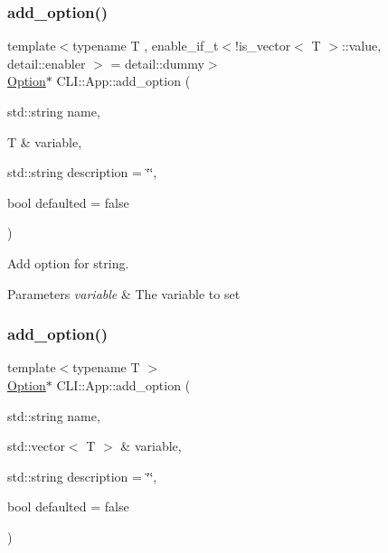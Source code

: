 \subsubsection{\texorpdfstring{add\+\_\+option()}{add\_option()}\hspace{0.1cm}{\footnotesize\ttfamily [2/3]}}
{\footnotesize\ttfamily template$<$typename T , enable\+\_\+if\+\_\+t$<$!is\+\_\+vector$<$ T $>$\+::value, detail\+::enabler $>$  = detail\+::dummy$>$ \\
\hyperlink{class_c_l_i_1_1_option}{Option}$\ast$ C\+L\+I\+::\+App\+::add\+\_\+option (\begin{DoxyParamCaption}\item[{std\+::string}]{name,  }\item[{T \&}]{variable,  }\item[{std\+::string}]{description = {\ttfamily \char`\"{}\char`\"{}},  }\item[{bool}]{defaulted = {\ttfamily false} }\end{DoxyParamCaption})\hspace{0.3cm}{\ttfamily [inline]}}



Add option for string. 


\begin{DoxyParams}{Parameters}
{\em variable} & The variable to set \\
\hline
\end{DoxyParams}
\mbox{\label{class_c_l_i_1_1_app_a0c65e4b0ad917b965e39d2e8f590bb53}} 
\subsubsection{\texorpdfstring{add\+\_\+option()}{add\_option()}\hspace{0.1cm}{\footnotesize\ttfamily [3/3]}}
{\footnotesize\ttfamily template$<$typename T $>$ \\
\hyperlink{class_c_l_i_1_1_option}{Option}$\ast$ C\+L\+I\+::\+App\+::add\+\_\+option (\begin{DoxyParamCaption}\item[{std\+::string}]{name,  }\item[{std\+::vector$<$ T $>$ \&}]{variable,  }\item[{std\+::string}]{description = {\ttfamily \char`\"{}\char`\"{}},  }\item[{bool}]{defaulted = {\ttfamily false} }\end{DoxyParamCaption})\hspace{0.3cm}{\ttfamily [inline]}}



